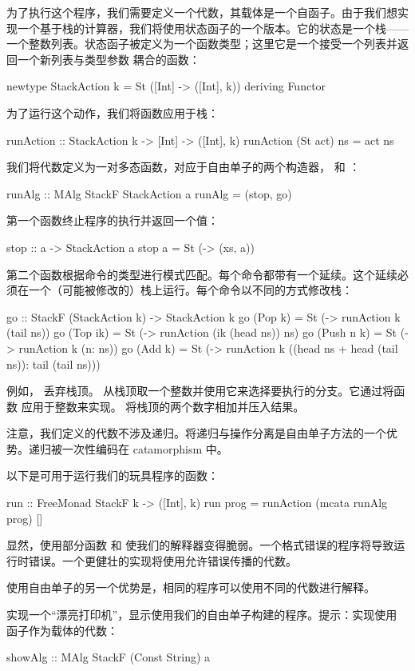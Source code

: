 \documentclass[DaoFP]{subfiles}
\begin{document}
为了执行这个程序，我们需要定义一个代数，其载体是一个自函子。由于我们想实现一个基于栈的计算器，我们将使用状态函子的一个版本。它的状态是一个栈——一个整数列表。状态函子被定义为一个函数类型；这里它是一个接受一个列表并返回一个新列表与类型参数  耦合的函数：
\begin{haskell}
newtype StackAction k = St ([Int] -> ([Int], k))
  deriving Functor
\end{haskell}

为了运行这个动作，我们将函数应用于栈：
\begin{haskell}
runAction :: StackAction k -> [Int] -> ([Int], k)
runAction (St act) ns = act ns
\end{haskell}

我们将代数定义为一对多态函数，对应于自由单子的两个构造器， 和 ：
\begin{haskell}
runAlg :: MAlg StackF StackAction a
runAlg = (stop, go)
\end{haskell}
第一个函数终止程序的执行并返回一个值：
\begin{haskell}
stop :: a -> StackAction a
stop a = St (\xs -> (xs, a))
\end{haskell}
第二个函数根据命令的类型进行模式匹配。每个命令都带有一个延续。这个延续必须在一个（可能被修改的）栈上运行。每个命令以不同的方式修改栈：
\begin{haskell}
go :: StackF (StackAction k) -> StackAction k
go (Pop k)    = St (\ns -> runAction k (tail ns))
go (Top ik)   = St (\ns -> runAction (ik (head ns)) ns)
go (Push n k) = St (\ns -> runAction k (n: ns))
go (Add k)    = St (\ns -> runAction k 
                   ((head ns + head (tail ns)): tail (tail ns)))
\end{haskell}
例如， 丢弃栈顶。 从栈顶取一个整数并使用它来选择要执行的分支。它通过将函数  应用于整数来实现。 将栈顶的两个数字相加并压入结果。

注意，我们定义的代数不涉及递归。将递归与操作分离是自由单子方法的一个优势。递归被一次性编码在 catamorphism 中。

以下是可用于运行我们的玩具程序的函数：
\begin{haskell}
run :: FreeMonad StackF k -> ([Int], k)
run prog = runAction (mcata runAlg prog) [] 
\end{haskell}

显然，使用部分函数  和  使我们的解释器变得脆弱。一个格式错误的程序将导致运行时错误。一个更健壮的实现将使用允许错误传播的代数。

使用自由单子的另一个优势是，相同的程序可以使用不同的代数进行解释。

\begin{exercise}
实现一个“漂亮打印机”，显示使用我们的自由单子构建的程序。提示：实现使用  函子作为载体的代数：
\begin{haskell}
showAlg :: MAlg StackF (Const String) a
\end{haskell}
\end{exercise}
\end{document}

